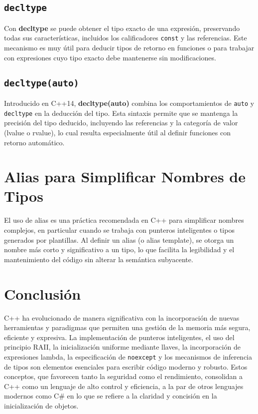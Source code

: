 \documentclass{article}
\begin{document}
\subsection{\texttt{decltype}}
Con \textbf{decltype} se puede obtener el tipo exacto de una expresión, preservando todas sus características, incluidos los calificadores \texttt{const} y las referencias. Este mecanismo es muy útil para deducir tipos de retorno en funciones o para trabajar con expresiones cuyo tipo exacto debe mantenerse sin modificaciones.

\subsection{\texttt{decltype(auto)}}
Introducido en C++14, \textbf{decltype(auto)} combina los comportamientos de \texttt{auto} y \texttt{decltype} en la deducción del tipo. Esta sintaxis permite que se mantenga la precisión del tipo deducido, incluyendo las referencias y la categoría de valor (lvalue o rvalue), lo cual resulta especialmente útil al definir funciones con retorno automático.

\section{Alias para Simplificar Nombres de Tipos}
El uso de alias es una práctica recomendada en C++ para simplificar nombres complejos, en particular cuando se trabaja con punteros inteligentes o tipos generados por plantillas. Al definir un alias (o alias template), se otorga un nombre más corto y significativo a un tipo, lo que facilita la legibilidad y el mantenimiento del código sin alterar la semántica subyacente.

\section{Conclusión}
C++ ha evolucionado de manera significativa con la incorporación de nuevas herramientas y paradigmas que permiten una gestión de la memoria más segura, eficiente y expresiva. La implementación de punteros inteligentes, el uso del principio RAII, la inicialización uniforme mediante llaves, la incorporación de expresiones lambda, la especificación de \texttt{noexcept} y los mecanismos de inferencia de tipos son elementos esenciales para escribir código moderno y robusto. Estos conceptos, que favorecen tanto la seguridad como el rendimiento, consolidan a C++ como un lenguaje de alto control y eficiencia, a la par de otros lenguajes modernos como C\# en lo que se refiere a la claridad y concisión en la inicialización de objetos.
\end{document}
